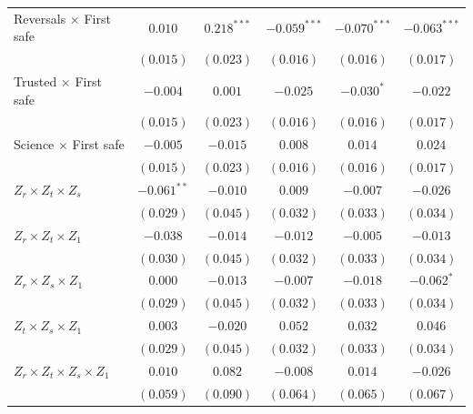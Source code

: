 \begin{table}
\begin{center}
\begin{tabular}{l c c || c c || c}
Reversals $\times$ First safe          & $0.010$        & $0.218^{***}$  & $-0.059^{***}$ & $-0.070^{***}$ & $-0.063^{***}$ \\
                                       & $(0.015)$      & $(0.023)$      & $(0.016)$      & $(0.016)$      & $(0.017)$      \\
Trusted $\times$ First safe            & $-0.004$       & $0.001$        & $-0.025$       & $-0.030^{*}$   & $-0.022$       \\
                                       & $(0.015)$      & $(0.023)$      & $(0.016)$      & $(0.016)$      & $(0.017)$      \\
Science $\times$ First safe            & $-0.005$       & $-0.015$       & $0.008$        & $0.014$        & $0.024$        \\
                                       & $(0.015)$      & $(0.023)$      & $(0.016)$      & $(0.016)$      & $(0.017)$      \\
$Z_r \times Z_t \times Z_s$            & $-0.061^{**}$  & $-0.010$       & $0.009$        & $-0.007$       & $-0.026$       \\
                                       & $(0.029)$      & $(0.045)$      & $(0.032)$      & $(0.033)$      & $(0.034)$      \\
$Z_r \times Z_t \times Z_1$            & $-0.038$       & $-0.014$       & $-0.012$       & $-0.005$       & $-0.013$       \\
                                       & $(0.030)$      & $(0.045)$      & $(0.032)$      & $(0.033)$      & $(0.034)$      \\
$Z_r \times Z_s \times Z_1$            & $0.000$        & $-0.013$       & $-0.007$       & $-0.018$       & $-0.062^{*}$   \\
                                       & $(0.029)$      & $(0.045)$      & $(0.032)$      & $(0.033)$      & $(0.034)$      \\
$Z_t \times Z_s \times Z_1$            & $0.003$        & $-0.020$       & $0.052$        & $0.032$        & $0.046$        \\
                                       & $(0.029)$      & $(0.045)$      & $(0.032)$      & $(0.033)$      & $(0.034)$      \\
$Z_r \times Z_t \times Z_s \times Z_1$ & $0.010$        & $0.082$        & $-0.008$       & $0.014$        & $-0.026$       \\
                                       & $(0.059)$      & $(0.090)$      & $(0.064)$      & $(0.065)$      & $(0.067)$      \\

\end{tabular}
\end{center}
\end{table}
